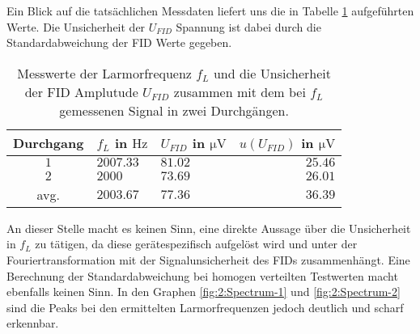 \documentclass[../../main.tex]{subfiles}
\begin{document}
    Ein Blick auf die tatsächlichen Messdaten liefert uns die in Tabelle \ref{tab:2:Larmor_Freq} aufgeführten Werte. Die Unsicherheit der $U_{\textit{FID}}$ Spannung ist dabei durch die Standardabweichung der FID Werte gegeben.
    \begin{table}[H]
        \centering
        \begin{tabular}{c|l|l|r}
            \textbf{Durchgang} & $f_L$ in $\si{\hertz}$ & $U_{\textit{FID}}$ in $\si{\micro\volt}$ & $u(U_{\textit{FID}})$ in $\si{\micro\volt}$\\
            \hline
            $1$ & $2007.33$ & $81.02$ & $25.46$\\
            $2$ & $2000$ & $73.69$ & $26.01$ \\
            \hline 
            avg. & $2003.67$ & $77.36$ & $36.39$
        \end{tabular}
        \caption{Messwerte der Larmorfrequenz $f_L$ und die Unsicherheit der FID Amplutude $U_{\textit{FID}}$ zusammen mit dem bei $f_L$ gemessenen Signal in zwei Durchgängen.}
        \label{tab:2:Larmor_Freq}
    \end{table}
    An dieser Stelle macht es keinen Sinn, eine direkte Aussage über die Unsicherheit in $f_L$ zu tätigen, da diese gerätespezifisch aufgelöst wird und unter der Fouriertransformation mit der Signalunsicherheit des FIDs zusammenhängt. Eine Berechnung der Standardabweichung bei homogen verteilten Testwerten macht ebenfalls keinen Sinn. In den Graphen \ref{fig:2:Spectrum-1} und \ref{fig:2:Spectrum-2} sind die Peaks bei den ermittelten Larmorfrequenzen jedoch deutlich und scharf erkennbar.
    
\end{document}
